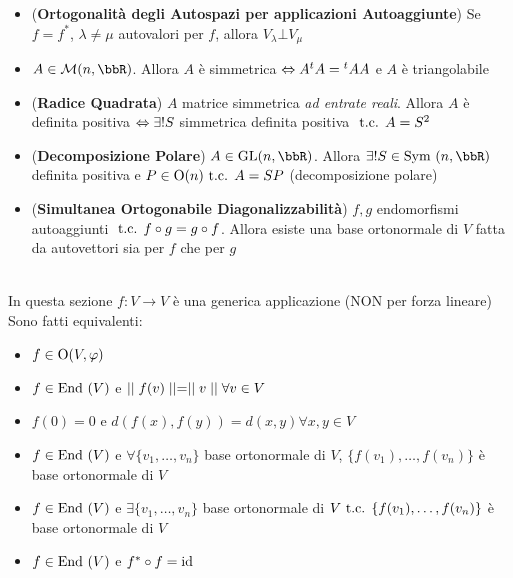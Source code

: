 \documentclass[a4paper,NoNotes,GeneralMath]{stdmdoc}
\begin{document}
\begin{itemize}
		\item ({\bf Ortogonalità degli Autospazi per applicazioni Autoaggiunte}) Se $f = f^{*}$, $\lambda \neq \mu$ autovalori per $f$, allora $V_\lambda \bot V_\mu$
		\item $A \in \mathcal{M}(n, \bbR)$. Allora $A$ è simmetrica $\Leftrightarrow A {}^tA = {}^tAA$ e $A$ è triangolabile
		\item ({\bf Radice Quadrata}) $A$ matrice simmetrica {\it ad entrate reali}. Allora $A$ è definita positiva $\Leftrightarrow \exists ! S$ simmetrica definita positiva $\mbox{ t.c. } A = S^2$
		\item ({\bf Decomposizione Polare}) $A \in \GL(n, \bbR)$. Allora $\exists ! S \in \Symm(n, \bbR)$ definita positiva e $P \in \mbox{O}(n) \mbox{ t.c. } A = SP$ (decomposizione polare)
		\item ({\bf Simultanea Ortogonabile Diagonalizzabilità}) $f, g$ endomorfismi autoaggiunti $\mbox{ t.c. } f \circ g = g \circ f$. Allora esiste una base ortonormale di $V$ fatta da autovettori sia per $f$ che per $g$
	\end{itemize}

	 \\
	In questa sezione $f: V \rightarrow V$ è una generica applicazione (NON per forza lineare) \\
	Sono fatti equivalenti:
	\begin{itemize}
		\item $f \in \mbox{O}(V, \varphi)$
		\item $f \in \mbox{End }(V)$ e $\mid\mid f(v) \mid\mid = \mid\mid v \mid\mid \forall v \in V$
		\item $f(0)=0$ e $d(f(x), f(y)) = d(x, y) \forall x, y \in V$
		\item $f \in \mbox{End }(V)$ e $\forall \{v_1, \ldots, v_n\}$ base ortonormale di $V$, $\{f(v_1), \ldots, f(v_n)\}$ è base ortonormale di $V$
		\item $f \in \mbox{End }(V)$ e $\exists \{v_1, \ldots, v_n\}$ base ortonormale di $V \mbox{ t.c. } \{f(v_1), \ldots, f(v_n)\}$ è base ortonormale di $V$
		\item $f \in \mbox{End }(V)$ e $f^{*} \circ f = \mbox{id}$
	\end{itemize}
\end{document}
